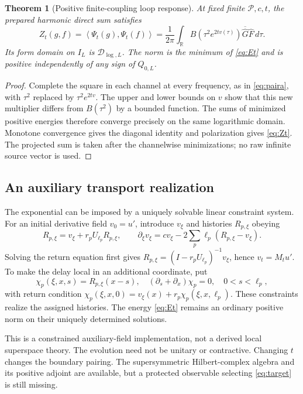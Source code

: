 \documentclass[11pt]{article}
\numberwithin{equation}{section}
\newtheorem{theorem}{Theorem}[section]
\theoremstyle{definition}
\theoremstyle{remark}
\newcommand{\R}{\mathbb R}
\newcommand{\ip}[2]{\left\langle#1,#2\right\rangle}
\begin{document}
\begin{theorem}[Positive finite-coupling loop response]
At fixed finite $\mathcal P,c,t$, the prepared harmonic direct sum satisfies
\begin{equation}
 Z_t(g,f)=\ip{\Psi_t(g)}{\Psi_t(f)}
 =\frac1{2\pi}\int_\R B(\tau^2e^{2tv(\tau)})
       \overline{\widehat G}\widehat F\,d\tau.
 \label{eq:Zt}
\end{equation}
Its form domain on $I_L$ is $\mathcal D_{\log,L}$. The norm is the minimum of \eqref{eq:Et} and is positive independently of any sign of $Q_{0,L}$.
\end{theorem}
\begin{proof}
Complete the square in each channel at every frequency, as in \eqref{eq:paira}, with $\tau^2$ replaced by $\tau^2e^{2tv}$. The upper and lower bounds on $v$ show that this new multiplier differs from $B(\tau^2)$ by a bounded function. The sums of minimized positive energies therefore converge precisely on the same logarithmic domain. Monotone convergence gives the diagonal identity and polarization gives \eqref{eq:Zt}. The projected sum is taken after the channelwise minimizations; no raw infinite source vector is used.
\end{proof}

\subsection{An auxiliary transport realization}
The exponential can be imposed by a uniquely solvable linear constraint system. For an initial derivative field $v_0=u'$, introduce $v_\xi$ and histories $R_{p,\xi}$ obeying
\begin{equation}
 R_{p,\xi}=v_\xi+r_pU_{\ell_p}R_{p,\xi},\qquad
 \partial_\xi v_\xi=cv_\xi-2\sum_p\ell_p(R_{p,\xi}-v_\xi).
 \label{eq:transport}
\end{equation}
Solving the return equation first gives $R_{p,\xi}=(I-r_pU_{\ell_p})^{-1}v_\xi$, hence $v_t=M_tu'$. To make the delay local in an additional coordinate, put
\begin{equation}
 \chi_p(\xi,x,s)=R_{p,\xi}(x-s),\quad
 (\partial_s+\partial_x)\chi_p=0,\quad0<s<\ell_p,
\end{equation}
with return condition
$\chi_p(\xi,x,0)=v_\xi(x)+r_p\chi_p(\xi,x,\ell_p)$.
These constraints realize the assigned histories. The energy \eqref{eq:Et} remains an ordinary positive norm on their uniquely determined solutions.

This is a constrained auxiliary-field implementation, not a derived local superspace theory. The evolution need not be unitary or contractive. Changing $t$ changes the boundary pairing. The supersymmetric Hilbert-complex algebra and its positive adjoint are available, but a protected observable selecting \eqref{eq:target} is still missing.
\end{document}
